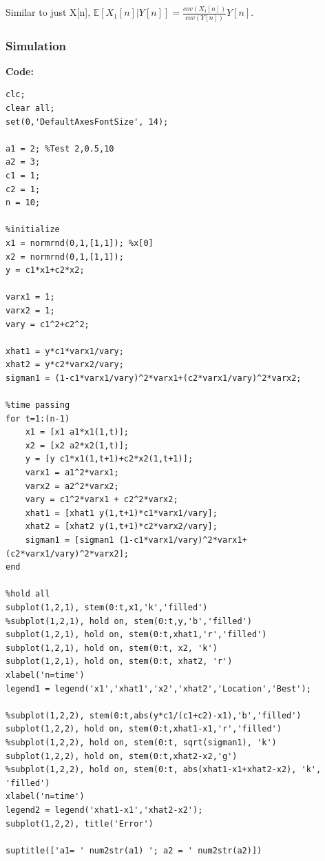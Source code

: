 \documentclass[leqno]{article}
\begin{document}
Similar to just X[n], $\mathbb{E}[X_1[n]|Y[n]] = \frac{cov(X_1[n])}{cov(Y[n])}Y[n]$.

\subsubsection{Simulation}
\textbf{Code:}
\begin{verbatim}
clc;
clear all;
set(0,'DefaultAxesFontSize', 14);

a1 = 2; %Test 2,0.5,10
a2 = 3;
c1 = 1;
c2 = 1;
n = 10;

%initialize
x1 = normrnd(0,1,[1,1]); %x[0]
x2 = normrnd(0,1,[1,1]);
y = c1*x1+c2*x2;

varx1 = 1;
varx2 = 1;
vary = c1^2+c2^2;

xhat1 = y*c1*varx1/vary;
xhat2 = y*c2*varx2/vary;
sigman1 = (1-c1*varx1/vary)^2*varx1+(c2*varx1/vary)^2*varx2;

%time passing
for t=1:(n-1)
    x1 = [x1 a1*x1(1,t)];
    x2 = [x2 a2*x2(1,t)];
    y = [y c1*x1(1,t+1)+c2*x2(1,t+1)];
    varx1 = a1^2*varx1;
    varx2 = a2^2*varx2;
    vary = c1^2*varx1 + c2^2*varx2;
    xhat1 = [xhat1 y(1,t+1)*c1*varx1/vary];
    xhat2 = [xhat2 y(1,t+1)*c2*varx2/vary];
    sigman1 = [sigman1 (1-c1*varx1/vary)^2*varx1+(c2*varx1/vary)^2*varx2];
end

%hold all
subplot(1,2,1), stem(0:t,x1,'k','filled')
%subplot(1,2,1), hold on, stem(0:t,y,'b','filled')
subplot(1,2,1), hold on, stem(0:t,xhat1,'r','filled')
subplot(1,2,1), hold on, stem(0:t, x2, 'k')
subplot(1,2,1), hold on, stem(0:t, xhat2, 'r')
xlabel('n=time')
legend1 = legend('x1','xhat1','x2','xhat2','Location','Best');

%subplot(1,2,2), stem(0:t,abs(y*c1/(c1+c2)-x1),'b','filled')
subplot(1,2,2), hold on, stem(0:t,xhat1-x1,'r','filled')
%subplot(1,2,2), hold on, stem(0:t, sqrt(sigman1), 'k')
subplot(1,2,2), hold on, stem(0:t,xhat2-x2,'g')
%subplot(1,2,2), hold on, stem(0:t, abs(xhat1-x1+xhat2-x2), 'k', 'filled')
xlabel('n=time')
legend2 = legend('xhat1-x1','xhat2-x2');
subplot(1,2,2), title('Error')

suptitle(['a1= ' num2str(a1) '; a2 = ' num2str(a2)])
\end{verbatim}
\end{document}
